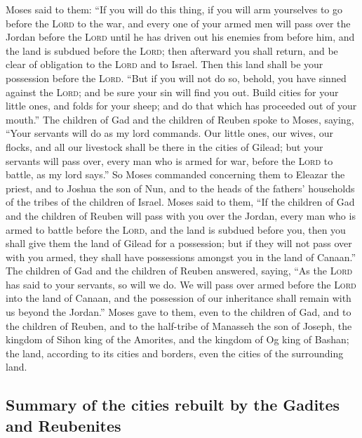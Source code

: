 Moses said to them: ``If you will do this thing, if you
will arm yourselves to go before the \textsc{Lord} to the war,
 and every one of your armed men will pass over the
Jordan before the \textsc{Lord} until he has driven out his enemies from
before him,  and the land is subdued before the
\textsc{Lord}; then afterward you shall return, and be clear of
obligation to the \textsc{Lord} and to Israel. Then this land shall be
your possession before the \textsc{Lord}.  ``But if you
will not do so, behold, you have sinned against the \textsc{Lord}; and
be sure your sin will find you out.  Build cities for
your little ones, and folds for your sheep; and do that which has
proceeded out of your mouth.''  The children of Gad and
the children of Reuben spoke to Moses, saying, ``Your servants will do
as my lord commands.  Our little ones, our wives, our
flocks, and all our livestock shall be there in the cities of Gilead;
 but your servants will pass over, every man who is armed
for war, before the \textsc{Lord} to battle, as my lord says.''
 So Moses commanded concerning them to Eleazar the
priest, and to Joshua the son of Nun, and to the heads of the fathers'
households of the tribes of the children of Israel. 
Moses said to them, ``If the children of Gad and the children of Reuben
will pass with you over the Jordan, every man who is armed to battle
before the \textsc{Lord}, and the land is subdued before you, then you
shall give them the land of Gilead for a possession;  but
if they will not pass over with you armed, they shall have possessions
amongst you in the land of Canaan.''  The children of Gad
and the children of Reuben answered, saying, ``As the \textsc{Lord} has
said to your servants, so will we do.  We will pass over
armed before the \textsc{Lord} into the land of Canaan, and the
possession of our inheritance shall remain with us beyond the Jordan.''
 Moses gave to them, even to the children of Gad, and to
the children of Reuben, and to the half-tribe of Manasseh the son of
Joseph, the kingdom of Sihon king of the Amorites, and the kingdom of Og
king of Bashan; the land, according to its cities and borders, even the
cities of the surrounding land.

\hypertarget{summary-of-the-cities-rebuilt-by-the-gadites-and-reubenites}{%
\subsection{Summary of the cities rebuilt by the Gadites and
Reubenites}\label{summary-of-the-cities-rebuilt-by-the-gadites-and-reubenites}}

